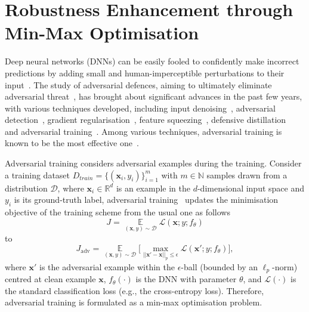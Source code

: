 \section{Robustness Enhancement through Min-Max Optimisation}\label{sec:advtrainingsection}



Deep neural networks (DNNs) can be easily fooled to confidently make incorrect predictions by adding small and human-imperceptible perturbations to their input~\cite{DBLP:journals/corr/GoodfellowSS14,szegedy2013intriguing,wu2020skip}. The study of adversarial defences, aiming to ultimately eliminate adversarial threat~\cite{kurakin2016adversarial}, has brought about significant advances in the past few years, with various techniques developed, including input denoising~\cite{bai2019hilbert}, adversarial detection~\cite{ma2018characterizing}, gradient regularisation~\cite{tramer2017ensemble}, feature squeezing~\cite{xu2017feature}, defensive distillation~\cite{papernot2016distillation} and adversarial training~\cite{madry2017towards,papernot2016distillation}. Among various techniques, adversarial training is known to be the most effective one~\cite{athalye2018obfuscated}.

Adversarial training
considers adversarial examples during the training. Consider a training dataset $D_{train}=\{(\mathbf{x}_i,y_i)\}_{i=1}^m$ with $m \in \mathbb{N}$ samples drawn from a distribution $\mathcal{D}$, where $\mathbf{x}_i \in \mathbb{R}^d$ is an example in the $d$-dimensional input space and $y_i$ is its ground-truth label, adversarial training~\cite{madry2017towards} updates the minimisation objective of the  training scheme from the usual one as follows 
\begin{equation}
J=\mathop{\mathbb{E}}\limits_{(\mathbf{x},y)\sim \mathcal{D}}  \mathcal{L}(\mathbf{x};y;f_\theta)
\label{eq0}
\end{equation}
to 
\begin{equation}
     J_{\mathrm{adv}}=\mathop{\mathbb{E}}\limits_{(\mathbf{x},y)\sim \mathcal{D}} \bigg[\max_{||\mathbf{x}'-\mathbf{x}||_p\le \epsilon} \mathcal{L}(\mathbf{x}';y;f_\theta)\bigg],
\label{eq1}
\end{equation}
where $\mathbf{x}'$ is the adversarial example within the $\epsilon$-ball (bounded by an $\ell_p$-norm) centred at clean example $\mathbf{x}$, $f_\theta(\cdot)$ is the DNN with parameter $\theta$, and $\mathcal{L}(\cdot)$ is the standard classification loss (e.g., the cross-entropy loss). 
Therefore, adversarial training is formulated as a min-max optimisation problem.



